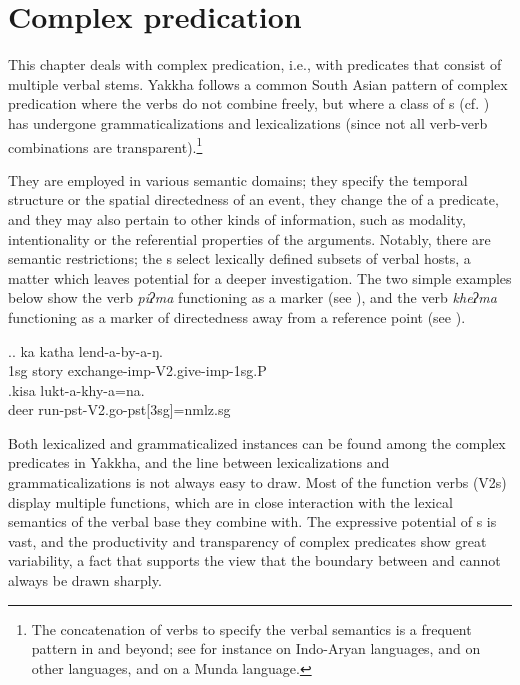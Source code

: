 ﻿\chapter{Complex predication}\label{verb-verb}

This chapter deals with complex predication, i.e., with predicates that consist of multiple verbal  stems. Yakkha follows a common South Asian pattern of complex predication where the verbs do not combine freely, but where  a class of s (cf. \citealt{Schultze-Berndt2006_Taking}) has undergone grammaticalizations and lexicalizations (since not all verb-verb combinations are transparent).\footnote{The concatenation of verbs to specify the verbal semantics is a frequent pattern in  and beyond; see for instance \citet{Butt1995The-structure, Hook1991_Emergence, Masica2001The-definition, Nespital1997Hindi, Pokharel1999Compound} on Indo-Aryan languages, and \citet{Matisoff1969The-syntax, DeLancey1991The-origin,  Bickel1996Aspect, Ebert1997A-grammar, Doornenbal2009A-grammar, Kansakar2005Classical} on other  languages, and \citet{Peterson2010_Kharia} on a Munda language.}

 They are employed in various semantic domains; they specify the temporal structure or the spatial directedness of an event, they change the  of a predicate, and  they may also pertain to other kinds of information, such as modality, intentionality or the  referential properties of the arguments. Notably, there are semantic restrictions; the s select lexically defined subsets of verbal hosts, a matter which leaves potential for a deeper investigation. The two simple examples below show the verb \emph{piʔma}  functioning as a  marker (see \Next[a]), and the verb \emph{kheʔma}  functioning as a marker of directedness away from a reference point (see \Next[b]).
 
 	\ex.\ag. ka katha lend-a-by-a-ŋ.\\
	{\sc 1sg} story  exchange{\sc -imp-V2.give-imp-1sg.P}\\
	\bg.kisa lukt-a-khy-a=na.\\
	deer run{\sc -pst-V2.go-pst[3sg]=nmlz.sg}\\
 
 

Both lexicalized and grammaticalized instances can be found among the complex predicates in Yakkha, and the line between lexicalizations and grammaticalizations is not always easy to draw. Most of the function verbs (V2s) display multiple functions, which are in close interaction with the lexical semantics of the verbal base they combine with. The expressive potential of s is vast, and the productivity and transparency of complex predicates show great variability, a fact that supports the view that the boundary between  and  cannot always be drawn sharply. 

